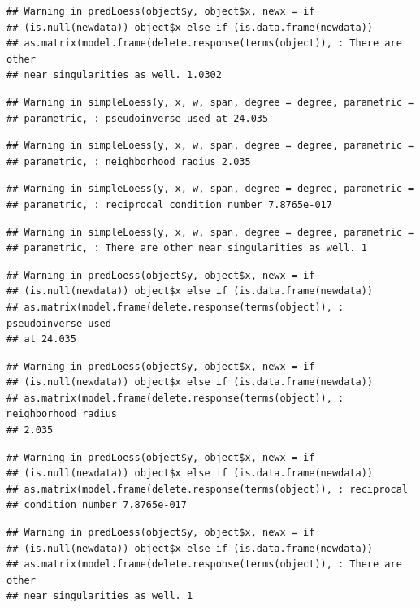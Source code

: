 \documentclass[]{book}
\theoremstyle{definition}
\theoremstyle{definition}
\theoremstyle{definition}
\theoremstyle{remark}
\begin{document}
\begin{enumerate}
\begin{verbatim}
## Warning in predLoess(object$y, object$x, newx = if
## (is.null(newdata)) object$x else if (is.data.frame(newdata))
## as.matrix(model.frame(delete.response(terms(object)), : There are other
## near singularities as well. 1.0302
\end{verbatim}

\begin{verbatim}
## Warning in simpleLoess(y, x, w, span, degree = degree, parametric =
## parametric, : pseudoinverse used at 24.035
\end{verbatim}

\begin{verbatim}
## Warning in simpleLoess(y, x, w, span, degree = degree, parametric =
## parametric, : neighborhood radius 2.035
\end{verbatim}

\begin{verbatim}
## Warning in simpleLoess(y, x, w, span, degree = degree, parametric =
## parametric, : reciprocal condition number 7.8765e-017
\end{verbatim}

\begin{verbatim}
## Warning in simpleLoess(y, x, w, span, degree = degree, parametric =
## parametric, : There are other near singularities as well. 1
\end{verbatim}

\begin{verbatim}
## Warning in predLoess(object$y, object$x, newx = if
## (is.null(newdata)) object$x else if (is.data.frame(newdata))
## as.matrix(model.frame(delete.response(terms(object)), : pseudoinverse used
## at 24.035
\end{verbatim}

\begin{verbatim}
## Warning in predLoess(object$y, object$x, newx = if
## (is.null(newdata)) object$x else if (is.data.frame(newdata))
## as.matrix(model.frame(delete.response(terms(object)), : neighborhood radius
## 2.035
\end{verbatim}

\begin{verbatim}
## Warning in predLoess(object$y, object$x, newx = if
## (is.null(newdata)) object$x else if (is.data.frame(newdata))
## as.matrix(model.frame(delete.response(terms(object)), : reciprocal
## condition number 7.8765e-017
\end{verbatim}

\begin{verbatim}
## Warning in predLoess(object$y, object$x, newx = if
## (is.null(newdata)) object$x else if (is.data.frame(newdata))
## as.matrix(model.frame(delete.response(terms(object)), : There are other
## near singularities as well. 1
\end{verbatim}


\end{enumerate}
\end{document}
